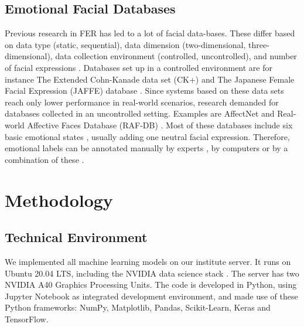 \documentclass[a4paper, conference]{IEEEtran}
\begin{document}
\subsection{Emotional Facial Databases}
Previous research in FER has led to a lot of facial data-bases. These differ based on data type (static, sequential), data dimension (two-dimensional, three-dimensional), data collection environment (controlled, uncontrolled), and number of facial expressions \cite{ekundayoFacialExpressionRecognition2021}. Databases set up in a controlled environment are for instance The Extended Cohn-Kanade data set (CK+) \cite{p.luceyExtendedCohnKanadeDataset2010} and The Japanese Female Facial Expression (JAFFE) database \cite{lyonsCodingFacialExpressions1998}. Since systems based on these data sets reach only lower performance in real-world scenarios, research demanded for databases collected in an uncontrolled setting. Examples are AffectNet \cite{mollahosseiniAffectnetDatabaseFacial2017} and Real-world Affective Faces Database (RAF-DB) \cite{liReliableCrowdsourcingDeep2017}. Most of these databases include six basic emotional states \cite{ekmanUnmaskingFaceGuide2003}, usually adding one neutral facial expression. Therefore, emotional labels can be annotated manually by experts \cite{mollahosseiniAffectnetDatabaseFacial2017}, by computers or by a combination of these \cite{goodfellowChallengesRepresentationLearning2013}.


\section{Methodology}
\label{method}

\subsection{Technical Environment}
We implemented all machine learning models on our institute server. It runs on Ubuntu 20.04 LTS, including the NVIDIA data science stack \cite{NVIDIADataScience2021}. The server has two NVIDIA A40 Graphics Processing Units. The code is developed in Python, using Jupyter Notebook as integrated development environment, and made use of these Python frameworks: NumPy, Matplotlib, Pandas, Scikit-Learn, Keras and TensorFlow.
\end{document}
